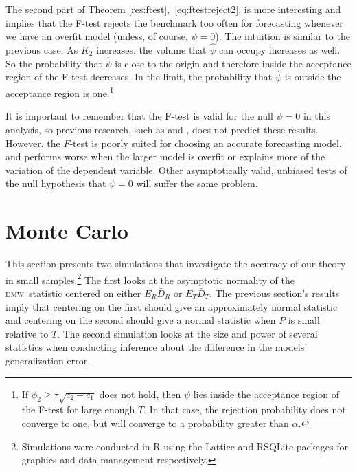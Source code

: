 \documentclass[11pt]{article}
\newcommand{\oosA}{\bar{D}_{R}}
\newcommand{\oosB}{\bar{D}_{T}}
\newcommand{\dmw}{\textsc{dmw}}
\begin{document}
The second part of Theorem \ref{res:ftest},~\eqref{eq:ftestreject2},
is more interesting and implies that the F-test rejects the benchmark
too often for forecasting whenever we have an overfit model (unless,
of course, $\psi = 0$).  The intuition is similar to the previous
case.  As $K_2$ increases, the volume that $\hat{\psi}$ can occupy
increases as well.  So the probability that $\hat{\psi}$ is close to
the origin and therefore inside the acceptance region of the F-test
decreases.  In the limit, the probability that $\hat{\psi}$ is outside
the acceptance region is one.\footnote{If $\phi_2 \geq \tau \sqrt{c_2
    - c_1}$ does not hold, then $\psi$ lies inside the acceptance
  region of the F-test for large enough $T$.  In that case, the
  rejection probability does not converge to one, but will converge to
  a probability greater than $\alpha$.}

It is important to remember that the F-test is valid for the null
$\psi = 0$ in this analysis, so previous research, such as
\citet{Ana:12} and \citet{Cal:11c}, does not predict these results.
However, the $F$-test is poorly suited for choosing an accurate
forecasting model, and performs worse when the larger model is overfit
or explains more of the variation of the dependent variable.  Other
asymptotically valid, unbiased tests of the null hypothesis that $\psi
= 0$ will suffer the same problem.

\section{Monte Carlo}\label{sec:mc}
\newcommand{\thetanorm}{\ensuremath{\lvert \theta \rvert_2}} This
section presents two simulations that investigate the accuracy of our
theory in small samples.\footnote{Simulations were conducted in R
  \citep{Rde:10} using the Lattice \citep{Sar:10} and RSQLite
  \citep{Jam:10} packages for graphics and data management
  respectively.}  The first looks at the asymptotic normality of the
\dmw\ statistic centered on either $E_R \oosA$ or $E_T \oosB$.
The previous section's results imply that centering on the first
should give an approximately normal statistic and centering on the
second should give a normal statistic when $P$ is small relative to
$T$.  The second simulation looks at the size and power of several
statistics when conducting inference about the difference in the
models' generalization error.
\end{document}
